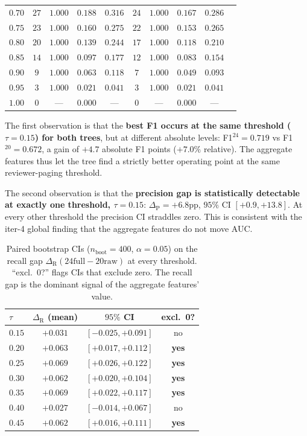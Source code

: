 \documentclass{article}
\begin{document}
\begin{table}[t]
\begin{tabular}{lccccccccc}
$0.70$ & $27$ & $1.000$ & $0.188$ & $0.316$ & $24$ & $1.000$ & $0.167$ & $0.286$ \\
$0.75$ & $23$ & $1.000$ & $0.160$ & $0.275$ & $22$ & $1.000$ & $0.153$ & $0.265$ \\
$0.80$ & $20$ & $1.000$ & $0.139$ & $0.244$ & $17$ & $1.000$ & $0.118$ & $0.210$ \\
$0.85$ & $14$ & $1.000$ & $0.097$ & $0.177$ & $12$ & $1.000$ & $0.083$ & $0.154$ \\
$0.90$ & $9$ & $1.000$ & $0.063$ & $0.118$ & $7$ & $1.000$ & $0.049$ & $0.093$ \\
$0.95$ & $3$ & $1.000$ & $0.021$ & $0.041$ & $3$ & $1.000$ & $0.021$ & $0.041$ \\
$1.00$ & $0$ & --- & $0.000$ & --- & $0$ & --- & $0.000$ & --- \\
\bottomrule
\end{tabular}
\end{table}

The first observation is that the \textbf{best F1 occurs at the same
threshold ($\tau = 0.15$) for both trees}, but at different absolute
levels: F1$^\text{24} = 0.719$ vs F1$^\text{20} = 0.672$, a gain of
$+4.7$ absolute F1 points ($+7.0\%$ relative). The aggregate features
thus let the tree find a strictly better operating point at the same
reviewer-paging threshold.

The second observation is that the \textbf{precision gap is statistically
detectable at exactly one threshold, $\tau = 0.15$}: $\Delta_\text{P} =
+6.8$pp, $95\%$ CI $[+0.9, +13.8]$. At every other threshold the
precision CI straddles zero. This is consistent with the iter-4 global
finding that the aggregate features do not move AUC.

\begin{table}[t]
\centering
\small
\caption{Paired bootstrap CIs ($n_\text{boot}{=}400$, $\alpha{=}0.05$)
on the recall gap $\Delta_\text{R}(\text{24full}{-}\text{20raw})$ at
every threshold. ``excl.\ 0?'' flags CIs that exclude zero. The recall
gap is the dominant signal of the aggregate features' value.}
\label{tab:p8-evidence-threshold-recall-boot}
\begin{tabular}{lccc}
\toprule
$\tau$ & $\Delta_\text{R}$ (mean) & $95\%$ CI & excl.\ 0? \\
\midrule
$0.15$ & $+0.031$ & $[-0.025, +0.091]$ & no \\
$\mathbf{0.20}$ & $\mathbf{+0.063}$ & $\mathbf{[+0.017, +0.112]}$ & \textbf{yes} \\
$\mathbf{0.25}$ & $\mathbf{+0.069}$ & $\mathbf{[+0.026, +0.122]}$ & \textbf{yes} \\
$\mathbf{0.30}$ & $\mathbf{+0.062}$ & $\mathbf{[+0.020, +0.104]}$ & \textbf{yes} \\
$\mathbf{0.35}$ & $\mathbf{+0.069}$ & $\mathbf{[+0.022, +0.117]}$ & \textbf{yes} \\
$0.40$ & $+0.027$ & $[-0.014, +0.067]$ & no \\
$\mathbf{0.45}$ & $\mathbf{+0.062}$ & $\mathbf{[+0.016, +0.111]}$ & \textbf{yes} \\
\bottomrule
\end{tabular}
\end{table}
\end{document}

